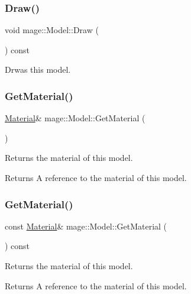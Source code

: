 \subsubsection{\texorpdfstring{Draw()}{Draw()}}
{\footnotesize\ttfamily void mage\+::\+Model\+::\+Draw (\begin{DoxyParamCaption}{ }\end{DoxyParamCaption}) const}

Drwas this model. \hypertarget{classmage_1_1_model_ae2d9b0fee188fe8f0377872bc2f8c2f6}{}\label{classmage_1_1_model_ae2d9b0fee188fe8f0377872bc2f8c2f6} 
\subsubsection{\texorpdfstring{Get\+Material()}{GetMaterial()}\hspace{0.1cm}{\footnotesize\ttfamily [1/2]}}
{\footnotesize\ttfamily \hyperlink{structmage_1_1_material}{Material}\& mage\+::\+Model\+::\+Get\+Material (\begin{DoxyParamCaption}{ }\end{DoxyParamCaption})}

Returns the material of this model.

\begin{DoxyReturn}{Returns}
A reference to the material of this model. 
\end{DoxyReturn}
\hypertarget{classmage_1_1_model_aedb16dfea55edaefc3e5d88e9f9fa756}{}\label{classmage_1_1_model_aedb16dfea55edaefc3e5d88e9f9fa756} 
\subsubsection{\texorpdfstring{Get\+Material()}{GetMaterial()}\hspace{0.1cm}{\footnotesize\ttfamily [2/2]}}
{\footnotesize\ttfamily const \hyperlink{structmage_1_1_material}{Material}\& mage\+::\+Model\+::\+Get\+Material (\begin{DoxyParamCaption}{ }\end{DoxyParamCaption}) const}

Returns the material of this model.

\begin{DoxyReturn}{Returns}
A reference to the material of this model. 
\end{DoxyReturn}
\hypertarget{classmage_1_1_model_a085c12b33ebe60e7576c643e2d47baf0}{}\label{classmage_1_1_model_a085c12b33ebe60e7576c643e2d47baf0} 
